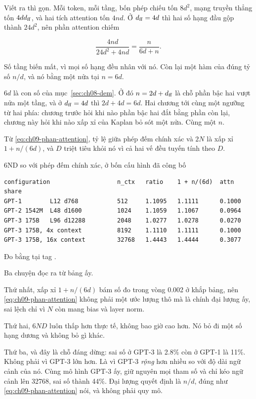 Viết ra thì gọn. Mỗi token, mỗi tầng, bốn phép chiếu tốn \(8d^2\), mạng truyền
thẳng tốn \(4dd_{\mathrm{ff}}\), và hai tích attention tốn \(4nd\). Ở \(d_{\mathrm{ff}} = 4d\) thì
hai số hạng đầu gộp thành \(24d^2\), nên phần attention chiếm

\begin{equation}
\label{eq:ch09-phan-attention}
\frac{4nd}{24d^2 + 4nd} = \frac{n}{6d + n}.
\end{equation}

Số tầng biến mất, vì mọi số hạng đều nhân với nó. Còn lại một hàm của đúng tỷ
số \(n/d\), và nó bằng một nửa tại \(n = 6d\).

\(6d\) là con số của mục~\ref{sec:ch08-dem}. Ở đó \(n = 2d + d_{\mathrm{ff}}\) là chỗ phần
bậc hai vượt nửa một tầng, và ở \(d_{\mathrm{ff}} = 4d\) thì \(2d + 4d = 6d\). Hai chương
tới cùng một ngưỡng từ hai phía: chương trước hỏi khi nào phần bậc hai đắt bằng
phần còn lại, chương này hỏi khi nào xấp xỉ của Kaplan bỏ sót một nửa. Cùng một
\(n\).

Từ \eqref{eq:ch09-phan-attention}, tỷ lệ giữa phép đếm chính xác và \(2N\) là
xấp xỉ \(1 + n/(6d)\), và \(D\) triệt tiêu khỏi nó vì cả hai vế đều tuyến tính
theo \(D\).

\begin{measured}{6ND so với phép đếm chính xác, ở bốn cấu hình đã công bố}
\begin{verbatim}
configuration                   n_ctx   ratio    1 + n/(6d)  attn share
GPT-1        L12 d768           512     1.1095   1.1111      0.1000
GPT-2 1542M  L48 d1600          1024    1.1059   1.1067      0.0964
GPT-3 175B   L96 d12288         2048    1.0277   1.0278      0.0270
GPT-3 175B, 4x context          8192    1.1110   1.1111      0.1000
GPT-3 175B, 16x context         32768   1.4443   1.4444      0.3077
\end{verbatim}

Đo bằng  tại tag .
\end{measured}

Ba chuyện đọc ra từ bảng ấy.

Thứ nhất, xấp xỉ \(1 + n/(6d)\) bám số đo trong vòng 0.002 ở khắp bảng, nên
\eqref{eq:ch09-phan-attention} không phải một ước lượng thô mà là chính đại
lượng ấy, sai lệch chỉ vì \(N\) còn mang bias và layer norm.

Thứ hai, \(6ND\) luôn thấp hơn thực tế, không bao giờ cao hơn. Nó bỏ đi một số
hạng dương và không bỏ gì khác.

Thứ ba, và đây là chỗ đáng dừng: sai số ở GPT-3 là 2.8\% còn ở GPT-1 là 11\%.
Không phải vì GPT-3 lớn hơn. Là vì GPT-3 \emph{rộng} hơn nhiều so với độ dài
ngữ cảnh của nó. Cùng mô hình GPT-3 ấy, giữ nguyên mọi tham số và chỉ kéo ngữ
cảnh lên 32768, sai số thành 44\%. Đại lượng quyết định là \(n/d\), đúng như
\eqref{eq:ch09-phan-attention} nói, và không phải quy mô.

